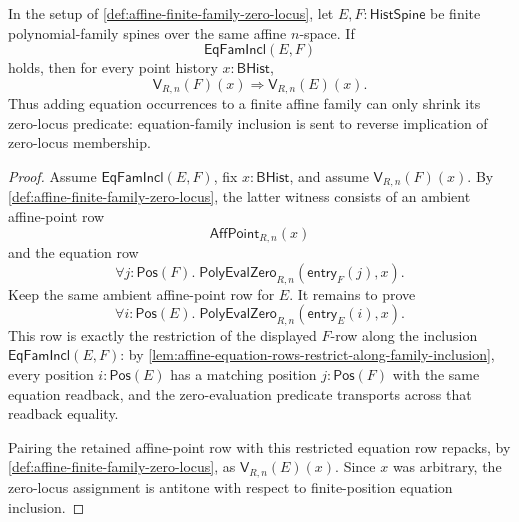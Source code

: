 \begin{theorem}
\label{thm:affinevar-zero-locus-antitone-equation-inclusion}
In the setup of \autoref{def:affine-finite-family-zero-locus}, let $E,F:\mathsf{HistSpine}$ be finite polynomial-family spines over the same affine $n$-space. If
$$
\mathsf{EqFamIncl}(E,F)
$$
holds, then for every point history $x:\mathsf{BHist}$,
$$
\mathsf{V}_{R,n}(F)(x)
\Longrightarrow
\mathsf{V}_{R,n}(E)(x).
$$
Thus adding equation occurrences to a finite affine family can only shrink its zero-locus predicate: equation-family inclusion is sent to reverse implication of zero-locus membership.
\end{theorem}
\begin{proof}
Assume $\mathsf{EqFamIncl}(E,F)$, fix $x:\mathsf{BHist}$, and assume $\mathsf{V}_{R,n}(F)(x)$. By \autoref{def:affine-finite-family-zero-locus}, the latter witness consists of an ambient affine-point row
$$
\mathsf{AffPoint}_{R,n}(x)
$$
and the equation row
$$
\forall j:\mathsf{Pos}(F).\;
\mathsf{PolyEvalZero}_{R,n}(\mathsf{entry}_{F}(j),x).
$$
Keep the same ambient affine-point row for $E$. It remains to prove
$$
\forall i:\mathsf{Pos}(E).\;
\mathsf{PolyEvalZero}_{R,n}(\mathsf{entry}_{E}(i),x).
$$
This row is exactly the restriction of the displayed $F$-row along the inclusion $\mathsf{EqFamIncl}(E,F)$: by \autoref{lem:affine-equation-rows-restrict-along-family-inclusion}, every position $i:\mathsf{Pos}(E)$ has a matching position $j:\mathsf{Pos}(F)$ with the same equation readback, and the zero-evaluation predicate transports across that readback equality.

Pairing the retained affine-point row with this restricted equation row repacks, by \autoref{def:affine-finite-family-zero-locus}, as $\mathsf{V}_{R,n}(E)(x)$. Since $x$ was arbitrary, the zero-locus assignment is antitone with respect to finite-position equation inclusion.
\end{proof}
